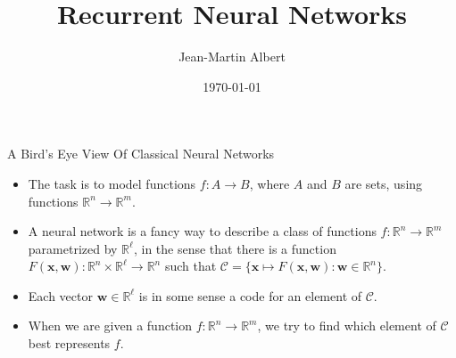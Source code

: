 \documentclass[10pt]{beamer}
\newcommand{\R}{\mathbb{R}}
\newcommand{\C}{\mathcal{C}}
\newcommand{\w}{\mathbf{w}}
\newcommand{\x}{\mathbf{x}}
\begin{document}
\title{Recurrent Neural Networks}
\author{Jean-Martin Albert}
\date{\today}
\maketitle


\begin{frame}{A Bird's Eye View Of Classical Neural Networks}

\begin{itemize}
  \item The task is to model functions $f:A\to B$, where $A$ and $B$ are sets, using functions $\R^n\to\R^m$.
  \item A neural network is a fancy way to describe a class of functions $f:\R^n\to \R^m$ parametrized by $\R^\ell$, in the sense that there is a function $F(\x, \w):\R^n\times \R^\ell\to\R^n$ such that $\C=\{\x\mapsto F(\x, \w):\w\in\R^n\}$.
  \item Each vector $\w\in\R^\ell$ is in some sense a code for an element of $\C$.
  \item When we are given a function $f:\R^n\to \R^m$, we try to find which element of $\C$ best represents $f$.
\end{itemize}

\end{frame}
\end{document}
